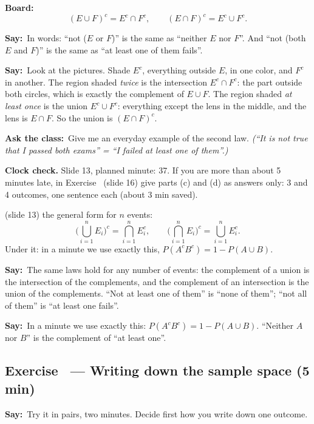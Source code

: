 \documentclass[11pt,a4paper,parskip=half]{scrartcl}
\newcommand{\say}{\textbf{\color{teal}Say:}\ }
\newcommand{\board}{\textbf{\color{gold}Board:}\ }
\newcommand{\ask}{\textbf{\color{navy}Ask the class:}\ }
\begin{document}
\board
\[ (E\cup F)^c=E^c\cap F^c,\qquad (E\cap F)^c=E^c\cup F^c. \]

\say In words: ``not ($E$ or $F$)'' is the same as ``neither $E$ nor $F$''.
And ``not (both $E$ and $F$)'' is the same as ``at least one of them
fails''.

\say Look at the pictures. Shade $E^c$, everything outside $E$, in one
color, and $F^c$ in another. The region shaded \emph{twice} is the
intersection $E^c\cap F^c$: the part outside both circles, which is exactly
the complement of $E\cup F$. The region shaded \emph{at least once} is the
union $E^c\cup F^c$: everything except the lens in the middle, and the lens
is $E\cap F$. So the union is $(E\cap F)^c$.

\ask Give me an everyday example of the second law. \emph{(``It is not true
that I passed both exams'' = ``I failed at least one of them''.)}

\begin{clockcheck}
	\textbf{Clock check.} Slide 13, planned minute: 37. If you are more than
	about 5 minutes late, in Exercise~ (slide 16) give
	parts (c) and (d) as answers only: 3 and 4 outcomes, one sentence each
	(about 3 min saved).
\end{clockcheck}

\begin{onslide}
	(slide 13) the general form for $n$ events:
	\[ \Big(\bigcup_{i=1}^n E_i\Big)^c=\bigcap_{i=1}^n E_i^c,\qquad
		\Big(\bigcap_{i=1}^n E_i\Big)^c=\bigcup_{i=1}^n E_i^c. \]
	Under it: in a minute we use exactly this, $P(A^cB^c)=1-P(A\cup B)$.
\end{onslide}

\say The same laws hold for any number of events: the complement of a
union is the intersection of the complements, and the complement of an
intersection is the union of the complements. ``Not at least one of them''
is ``none of them''; ``not all of them'' is ``at least one fails''.

\say In a minute we use exactly this: $P(A^cB^c)=1-P(A\cup B)$. ``Neither
$A$ nor $B$'' is the complement of ``at least one''.

\subsection{Exercise~ --- Writing down the sample space (5 min)}


\say Try it in pairs, two minutes. Decide first how you write down one
outcome.
\end{document}
